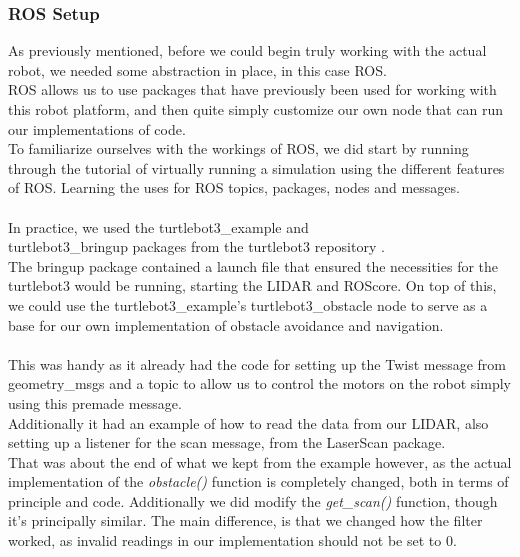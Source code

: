 \documentclass[conference]{IEEEtran}
\begin{document}
\subsubsection{ROS Setup}
As previously mentioned, before we could begin truly working with the actual robot, we needed some abstraction in place, 
in this case ROS.\\
ROS allows us to use packages that have previously been used for working with this robot platform, 
and then quite simply customize our own node that can run our implementations of code. \\
To familiarize ourselves with the workings of ROS, we did start by running through the tutorial of 
virtually running a simulation using the different features of ROS. Learning the uses for ROS topics, packages, 
nodes and messages.\\
\vspace*{2pt}\\
In practice, we used the turtlebot3\_example and \\turtlebot3\_bringup packages from the turtlebot3 repository \cite{b8}. \\
The bringup package contained a launch file that ensured the necessities for the turtlebot3 would be running, 
starting the LIDAR and ROScore. On top of this, we could use the turtlebot3\_example's turtlebot3\_obstacle node 
to serve as a base for our own implementation of obstacle avoidance and navigation.\\
\vspace*{2pt}\\
This was handy as it already had the code for setting up the Twist message from geometry\_msgs and a topic to allow 
us to control the motors on the robot simply using this premade message.\\
Additionally it had an example of how to read the data from our LIDAR, also setting up a listener for the scan message, 
from the LaserScan package.\\
That was about the end of what we kept from the example however, as the actual implementation of the \textit{obstacle()} function 
is completely changed, both in terms of principle and code. Additionally we did modify the \textit{get\_scan()} function, 
though it's principally similar. The main difference, is that we changed how the filter worked, as invalid readings 
in our implementation should not be set to 0.
\\
\vspace*{2pt}\\
\end{document}
